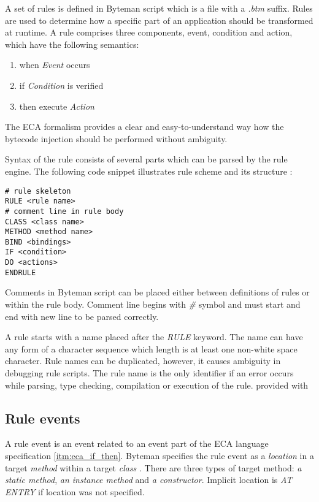 \documentclass[12pt,oneside]{fithesis2}
\begin{document}
A set of rules is defined in Byteman script which is a file with a \textit{.btm} suffix. Rules are used to determine how a specific part of an application should be transformed at runtime. A rule comprises three components, event, condition and action, which have the following semantics\cite{eca}:

\begin{enumerate}
\label{itm:eca_if_then}
   \item when \textit{Event} occurs
   \item if \textit{Condition} is verified
   \item then execute \textit{Action}
\end{enumerate}

The ECA formalism provides a clear and easy-to-understand way how the bytecode injection should be performed without ambiguity.

Syntax of the rule consists of several parts which can be parsed by the rule engine. The following code snippet illustrates rule scheme and its structure \cite[Rule Events]{byteman_doc}:

\begin{lstlisting}[caption = Byteman rule scheme, label = byteman_scheme]
# rule skeleton
RULE <rule name>
# comment line in rule body
CLASS <class name>
METHOD <method name>
BIND <bindings>
IF <condition>
DO <actions>
ENDRULE
\end{lstlisting}

Comments in Byteman script can be placed either between definitions of rules or within the rule body. Comment line begins with \textit{\#} symbol and must start and end with new line to be parsed correctly.

A rule starts with a name placed after the \textit{RULE} keyword. The name can have any form of a character sequence which length is at least one non-white space character. Rule names can be duplicated, however, it causes ambiguity in debugging rule scripts. The rule name is the only identifier if an error occurs while parsing, type checking, compilation or execution of the rule.
provided with
\subsection{Rule events}
A rule event is an event related to an event part of the ECA language specification \ref{itm:eca_if_then}. Byteman specifies the rule event as a \textit{location} in a target \textit{method} within a target \textit{class} \cite[Rule Events]{byteman_doc}. There are three types of target method: \textit{a static method}, \textit{an instance method} and \textit{a constructor}. Implicit location is \textit{AT ENTRY} if location was not specified.
\end{document}

